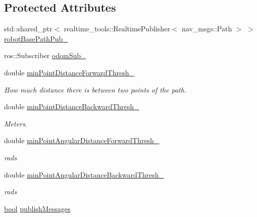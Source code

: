 \subsection*{Protected Attributes}
\begin{DoxyCompactItemize}
\item 
std\+::shared\+\_\+ptr$<$ realtime\+\_\+tools\+::\+Realtime\+Publisher$<$ nav\+\_\+msgs\+::\+Path $>$ $>$ \hyperlink{classmove__base__z__client_1_1odom__tracker_1_1OdomTracker_a3eb6ca9be9504dc3c1da949d1e1daeda}{robot\+Base\+Path\+Pub\+\_\+}
\item 
ros\+::\+Subscriber \hyperlink{classmove__base__z__client_1_1odom__tracker_1_1OdomTracker_a6a6b1dcb9f0cfae01007ca949b562ee2}{odom\+Sub\+\_\+}
\item 
double \hyperlink{classmove__base__z__client_1_1odom__tracker_1_1OdomTracker_ac306033eff926950e9b9a16e05a0c639}{min\+Point\+Distance\+Forward\+Thresh\+\_\+}
\begin{DoxyCompactList}\small\item\em How much distance there is between two points of the path. \end{DoxyCompactList}\item 
double \hyperlink{classmove__base__z__client_1_1odom__tracker_1_1OdomTracker_afdcfc389baa89c5583bf32bf5fdc7e16}{min\+Point\+Distance\+Backward\+Thresh\+\_\+}
\begin{DoxyCompactList}\small\item\em Meters. \end{DoxyCompactList}\item 
double \hyperlink{classmove__base__z__client_1_1odom__tracker_1_1OdomTracker_a8675c1d9bd1713d46a467d4aa1aa29a2}{min\+Point\+Angular\+Distance\+Forward\+Thresh\+\_\+}
\begin{DoxyCompactList}\small\item\em rads \end{DoxyCompactList}\item 
double \hyperlink{classmove__base__z__client_1_1odom__tracker_1_1OdomTracker_ad50ecd0f634a3b9d2f68a54788b8c96a}{min\+Point\+Angular\+Distance\+Backward\+Thresh\+\_\+}
\begin{DoxyCompactList}\small\item\em rads \end{DoxyCompactList}\item 
\hyperlink{classbool}{bool} \hyperlink{classmove__base__z__client_1_1odom__tracker_1_1OdomTracker_a7fa39bb2ddd9e60778687c854ea0c59c}{publish\+Messages}
\item 

\end{DoxyCompactItemize}
